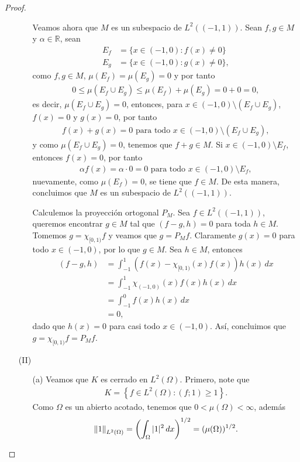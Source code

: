 \begin{proof}
\begin{enumerate}
\begin{enumerate}
        Veamos ahora que $M$ es un subespacio de $L^2((-1,1))$. Sean $f,g \in M$ y $\alpha\in \mathbb{R}$, sean 
        \begin{align*}
            E_f&=\{x\in (-1,0):f(x)\neq 0\}\\
            E_g&=\{x \in (-1,0):g(x)\neq 0\},
        \end{align*}
        como $f,g \in M$, $\mu(E_f)=\mu(E_g)=0$ y por tanto
        \begin{align*}
            0\leq \mu(E_f\cup E_g)\leq \mu(E_f)+\mu(E_g)=0+0=0,
        \end{align*}
        es decir, $\mu(E_f\cup E_g)=0$, entonces, para $x \in (-1,0)\setminus (E_f\cup E_g)$, $f(x)=0$ y $g(x)=0$, por tanto
        \begin{align*}
            f(x)+g(x)=0 \text{ para todo } x \in (-1,0)\setminus (E_f\cup E_g),
        \end{align*}
        y como $\mu(E_f\cup E_g)=0$, tenemos que $f+g\in M$. Si $x \in (-1,0)\setminus E_f$, entonces $f(x)=0$, por tanto
        \begin{align*}
            \alpha f(x)=\alpha\cdot 0=0 \text{ para todo } x \in (-1,0)\setminus E_f,
        \end{align*}
        nuevamente, como $\mu(E_f)=0$, se tiene que $f \in M$. De esta manera, concluimos que $M$ es un subespacio de $L^2((-1,1))$. 

        Calculemos la proyección ortogonal $P_M$. Sea $f\in L^2((-1,1))$, queremos encontrar $g \in M$ tal que $(f-g,h)=0$ para toda $h \in M$. Tomemos $g=\chi_{[0,1)}f$ y veamos que $g=P_M f$. Claramente $g(x)=0$ para todo $x \in (-1,0)$, por lo que $g \in M$. Sea $h \in M$, entonces
        \begin{align*}
            (f-g,h)&=\int_{-1}^1(f(x)-\chi_{[0,1)}(x)f(x))h(x)\, dx\\
            &=\int_{-1}^1\chi_{(-1,0)}(x)f(x)h(x)\, dx\\
            &=\int_{-1}^0f(x)h(x)\, dx\\
            &=0,
        \end{align*}
        dado que $h(x)=0$ para casi todo $x\in (-1,0)$. Así, concluimos que\\ $g=\chi_{[0,1)}f=P_Mf$.
        \end{enumerate}

        \item[(II)] \begin{enumerate}
            \item[(a)] Veamos que $K$ es cerrado en $L^2(\Omega)$. Primero, note que
        \begin{align*}
            K=\left\{f \in L^2(\Omega):(f;1)\geq 1\right\}.
        \end{align*}
        Como $\Omega$ es un abierto acotado, tenemos que $0<\mu(\Omega)<\infty$, además
        \begin{align*}
            \left\|1\right\|_{L^2(\Omega)}=\left(\int_{\Omega}|1|^2\, dx\right)^{1/2}=(\mu(\Omega))^{1/2}.
        \end{align*}
        

\end{enumerate}
\end{enumerate}
\end{proof}
